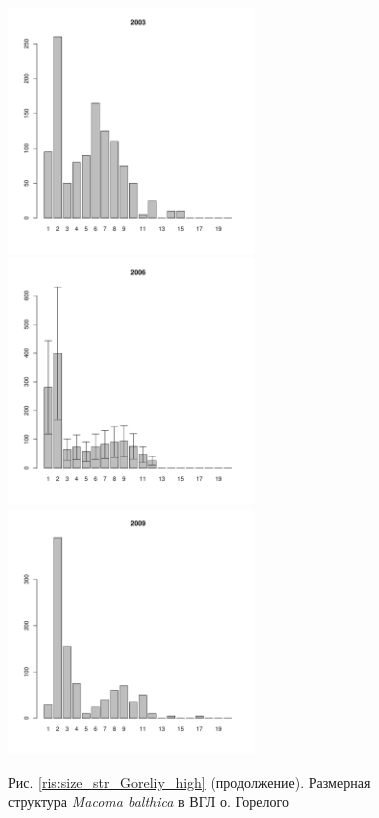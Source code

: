 \documentclass[12pt, a4paper]{article}
\begin{document}
\begin{figure}[h]
\begin{multicols}{3}
\hfill
\includegraphics[width=65mm]{../White_Sea/Luvenga_Goreliy/high_2003_.pdf}
\hfill
\includegraphics[width=65mm]{../White_Sea/Luvenga_Goreliy/high_2006_.pdf}
\hfill
\includegraphics[width=65mm]{../White_Sea/Luvenga_Goreliy/high_2009_.pdf}
\end{multicols}



\begin{center}
Рис. \ref{ris:size_str_Goreliy_high} (продолжение). Размерная структура {\it Macoma balthica} в ВГЛ о. Горелого

\end{center}
\end{figure}
\end{document}
